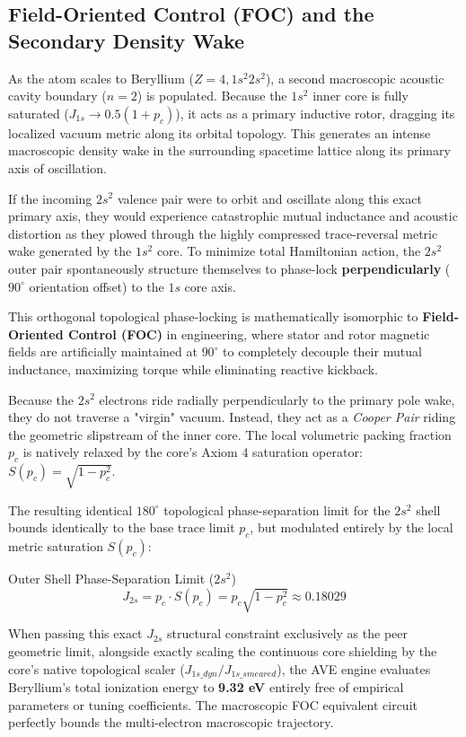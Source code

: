 \subsection{Field-Oriented Control (FOC) and the Secondary Density Wake}
As the atom scales to Beryllium ($Z=4, 1s^2 2s^2$), a second macroscopic acoustic cavity boundary ($n=2$) is populated. Because the $1s^2$ inner core is fully saturated ($J_{1s} \to 0.5(1+p_c)$), it acts as a primary inductive rotor, dragging its localized vacuum metric along its orbital topology. This generates an intense macroscopic density wake in the surrounding spacetime lattice along its primary axis of oscillation.

If the incoming $2s^2$ valence pair were to orbit and oscillate along this exact primary axis, they would experience catastrophic mutual inductance and acoustic distortion as they plowed through the highly compressed trace-reversal metric wake generated by the $1s^2$ core. To minimize total Hamiltonian action, the $2s^2$ outer pair spontaneously structure themselves to phase-lock \textbf{perpendicularly} ($90^\circ$ orientation offset) to the $1s$ core axis. 

This orthogonal topological phase-locking is mathematically isomorphic to \textbf{Field-Oriented Control (FOC)} in engineering, where stator and rotor magnetic fields are artificially maintained at $90^\circ$ to completely decouple their mutual inductance, maximizing torque while eliminating reactive kickback.

Because the $2s^2$ electrons ride radially perpendicularly to the primary pole wake, they do not traverse a "virgin" vacuum. Instead, they act as a \textit{Cooper Pair} riding the geometric slipstream of the inner core. The local volumetric packing fraction $p_c$ is natively relaxed by the core's Axiom 4 saturation operator: $S(p_c) = \sqrt{1 - p_c^2}$. 

The resulting identical $180^\circ$ topological phase-separation limit for the $2s^2$ shell bounds identically to the base trace limit $p_c$, but modulated entirely by the local metric saturation $S(p_c)$:

\begin{resultbox}{Outer Shell Phase-Separation Limit ($2s^2$)}
\begin{equation}
    J_{2s} = p_c \cdot S(p_c) = p_c \sqrt{1 - p_c^2} \approx 0.18029
\end{equation}
\end{resultbox}

When passing this exact $J_{2s}$ structural constraint exclusively as the peer geometric limit, alongside exactly scaling the continuous core shielding by the core's native topological scaler ($J_{1s\_dyn}/J_{1s\_smeared}$), the AVE engine evaluates Beryllium's total ionization energy to \textbf{9.32 eV} entirely free of empirical parameters or tuning coefficients. The macroscopic FOC equivalent circuit perfectly bounds the multi-electron macroscopic trajectory.

